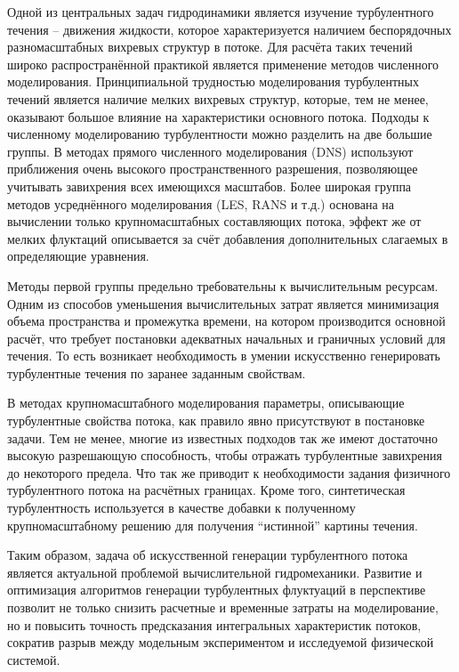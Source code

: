 Одной из центральных задач гидродинамики является изучение турбулентного течения --
движения жидкости, которое характеризуется наличием беспорядочных разномасштабных вихревых структур в потоке.
Для расчёта таких течений широко распространённой практикой является применение методов численного моделирования.
Принципиальной трудностью моделирования турбулентных течений является
наличие мелких вихревых структур, которые, тем не менее, оказывают
большое влияние на характеристики основного потока.
Подходы к численному моделированию турбулентности можно разделить на две большие группы.
В методах прямого численного моделирования (DNS) используют
приближения очень высокого пространственного разрешения, позволяющее учитывать
завихрения всех имеющихся масштабов.
Более широкая группа методов усреднённого моделирования (LES, RANS и т.д.)
основана на вычислении только крупномасштабных составляющих
потока, эффект же от мелких флуктаций описывается
за счёт добавления дополнительных слагаемых
в определяющие уравнения.

Методы первой группы предельно требовательны
к вычислительным ресурсам.
Одним из способов уменьшения вычислительных затрат
является минимизация объема пространства и промежутка времени,
на котором производится основной расчёт,
что требует постановки адекватных начальных и граничных условий для течения.
То есть возникает необходимость в умении искусственно генерировать турбулентные течения
по заранее заданным свойствам.

В методах крупномасштабного моделирования
параметры, описывающие турбулентные свойства потока, как правило
явно присутствуют в постановке задачи. Тем не менее,
многие из известных подходов так же 
имеют достаточно высокую разрешающую способность,
чтобы отражать турбулентные завихрения до некоторого предела.
Что так же приводит к необходимости задания физичного турбулентного потока
на расчётных границах.
Кроме того, синтетическая турбулентность используется в качестве добавки к полученному 
крупномасштабному решению для получения ``истинной'' картины течения.

Таким образом, задача об искусственной генерации турбулентного потока
является актуальной проблемой вычислительной гидромеханики.
Развитие и оптимизация алгоритмов генерации турбулентных флуктуаций в перспективе позволит
не только снизить расчетные и временные затраты на моделирование,
но и повысить точность предсказания интегральных характеристик потоков,
сократив разрыв между модельным экспериментом и исследуемой физической системой. 

